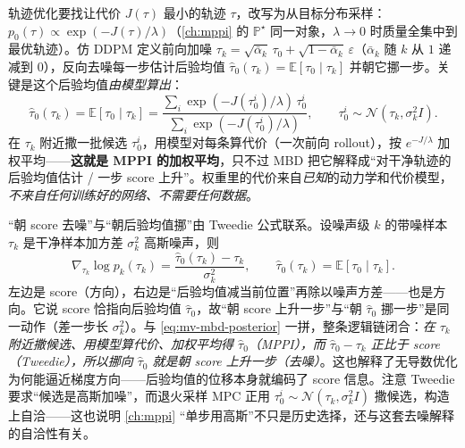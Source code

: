 \begin{theorem}\label{thm:mv-mbd}
轨迹优化要找让代价 $J(\tau)$ 最小的轨迹 $\tau$，改写为从目标分布采样：$p_0(\tau)\propto\exp(-J(\tau)/\lambda)$（\cref{ch:mppi} 的 $\mathbb{P}^\star$ 同一对象，$\lambda\to0$ 时质量全集中到最优轨迹）。仿 DDPM 定义前向加噪 $\tau_k=\sqrt{\bar\alpha_k}\,\tau_0+\sqrt{1-\bar\alpha_k}\,\varepsilon$（$\bar\alpha_k$ 随 $k$ 从 $1$ 递减到 $0$），反向去噪每一步估计后验均值 $\hat\tau_0(\tau_k)=\mathbb{E}[\tau_0\mid\tau_k]$ 并朝它挪一步。关键是这个后验均值\emph{由模型算出}：
\begin{equation}
  \hat\tau_0(\tau_k)=\mathbb{E}[\tau_0\mid\tau_k]=\frac{\sum_i \exp(-J(\tau_0^i)/\lambda)\,\tau_0^i}{\sum_i \exp(-J(\tau_0^i)/\lambda)},\qquad \tau_0^i\sim\mathcal{N}(\tau_k,\sigma_k^2 I).
  \label{eq:mv-mbd-posterior}
\end{equation}
在 $\tau_k$ 附近撒一批候选 $\tau_0^i$，用模型对每条算代价（一次前向 rollout），按 $e^{-J/\lambda}$ 加权平均——\textbf{这就是 MPPI 的加权平均}，只不过 MBD 把它解释成“对干净轨迹的后验均值估计 / 一步 score 上升”。权重里的代价来自\emph{已知}的动力学和代价模型，\emph{不来自任何训练好的网络、不需要任何数据}\cite{pan2024mbd}。
\end{theorem}

\begin{derivation}
“朝 score 去噪”与“朝后验均值挪”由 Tweedie 公式联系。设噪声级 $k$ 的带噪样本 $\tau_k$ 是干净样本加方差 $\sigma_k^2$ 高斯噪声，则
\begin{equation}
  \nabla_{\tau_k}\log p_k(\tau_k)=\frac{\hat\tau_0(\tau_k)-\tau_k}{\sigma_k^2},\qquad \hat\tau_0(\tau_k)=\mathbb{E}[\tau_0\mid\tau_k].
  \label{eq:mv-tweedie}
\end{equation}
左边是 score（方向），右边是“后验均值减当前位置”再除以噪声方差——也是方向。它说 score 恰指向后验均值 $\hat\tau_0$，故“朝 score 上升一步”与“朝 $\hat\tau_0$ 挪一步”是同一动作（差一步长 $\sigma_k^2$）。与 \cref{eq:mv-mbd-posterior} 一拼，整条逻辑链闭合：\emph{在 $\tau_k$ 附近撒候选、用模型算代价、加权平均得 $\hat\tau_0$（MPPI），而 $\hat\tau_0-\tau_k$ 正比于 score（Tweedie），所以挪向 $\hat\tau_0$ 就是朝 score 上升一步（去噪）}。这也解释了无导数优化为何能逼近梯度方向——后验均值的位移本身就编码了 score 信息。注意 Tweedie 要求“候选是高斯加噪”，而退火采样 MPC 正用 $\tau_0^i\sim\mathcal{N}(\tau_k,\sigma_k^2 I)$ 撒候选，构造上自洽——这也说明 \cref{ch:mppi} “单步用高斯”不只是历史选择，还与这套去噪解释的自洽性有关。
\end{derivation}

